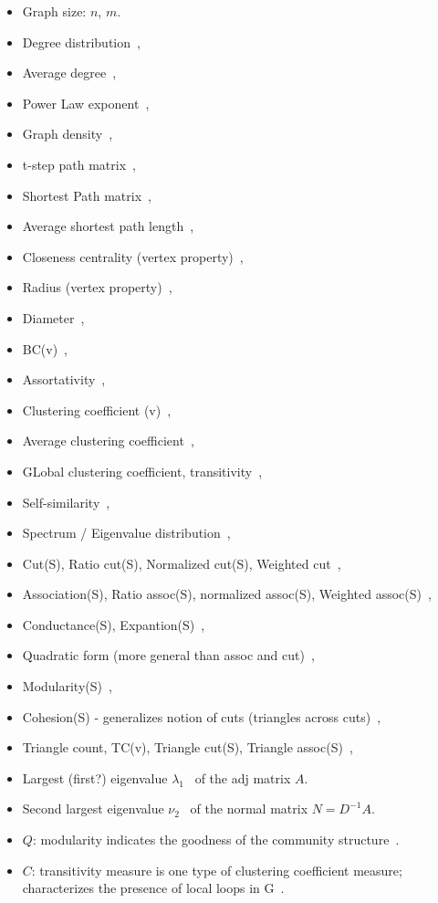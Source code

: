 \documentclass[preprint]{sig-alternate-05-2015}
\begin{document}
\begin{itemize}
%
\item Graph size: $n$, $m$.
%
\item Degree distribution~\cite{hu2013survey},
%
\item Average degree~\cite{hu2013survey},
%
\item Power Law exponent~\cite{hu2013survey},
%
\item Graph density~\cite{hu2013survey},
%
\item t-step path matrix~\cite{hu2013survey},
%
\item Shortest Path matrix~\cite{hu2013survey},
%
\item Average shortest path length~\cite{hu2013survey},
%
\item Closeness centrality (vertex property)~\cite{hu2013survey},
%
\item Radius (vertex property)~\cite{hu2013survey},
%
\item Diameter~\cite{hu2013survey},
%
\item BC(v)~\cite{hu2013survey},
%
\item Assortativity~\cite{hu2013survey},
%
\item Clustering coefficient (v)~\cite{hu2013survey},
%
\item Average clustering coefficient~\cite{hu2013survey},
%
\item GLobal clustering coefficient, transitivity~\cite{hu2013survey},
%
\item Self-similarity~\cite{hu2013survey},
%
\item Spectrum / Eigenvalue distribution~\cite{hu2013survey},
%
\item Cut(S), Ratio cut(S), Normalized cut(S), Weighted cut~\cite{hu2013survey},
%
\item Association(S), Ratio assoc(S), normalized assoc(S), Weighted assoc(S)~\cite{hu2013survey},
%
\item Conductance(S), Expantion(S)~\cite{hu2013survey},
%
\item Quadratic form (more general than assoc and cut)~\cite{hu2013survey},
%
\item Modularity(S)~\cite{hu2013survey},
%
\item Cohesion(S) - generalizes notion of cuts (triangles across cuts)~\cite{hu2013survey},
%
\item Triangle count, TC(v), Triangle cut(S), Triangle assoc(S)~\cite{hu2013survey},
%
\item Largest (first?) eigenvalue $\lambda_1$~\cite{wu2010reconstruction} of the adj
matrix $A$.
%
\item Second largest eigenvalue $\nu_2$~\cite{wu2010reconstruction} of the normal
matrix $N = D^{-1} A$.
%
\item $Q$: modularity indicates the goodness of the community
structure~\cite{wu2010reconstruction}.
%
\item $C$: transitivity measure is one type of clustering coefficient measure;
characterizes the presence of local loops in G~\cite{wu2010reconstruction}.
%
\end{itemize}




\end{document}
